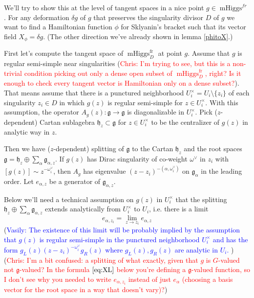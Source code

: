 \documentclass[11pt, oneside, reqno]{amsart}
\theoremstyle{definition} \newtheorem{definition}{Definition}[section]
\theoremstyle{definition} \newtheorem{remark}[definition]{Remark}
\theoremstyle{definition} \newtheorem{remarks}[definition]{Remarks}
\theoremstyle{definition} \newtheorem{question}[definition]{Question}
\theoremstyle{definition} \newtheorem*{note}{Note}
\theoremstyle{definition} \newtheorem{example}[definition]{Example}
\theoremstyle{definition} \newtheorem{examples}[definition]{Examples}
\renewcommand{\gg}{\mathfrak{g}}
\DeclareMathOperator{\mhiggs}{mHiggs}
\newcommand{\fr}{\mathrm{fr}}
\newcommand{\chris}[1]{(\textcolor{red}{Chris: #1})}
\newcommand{\vasily}[1]{(\textcolor{blue}{Vasily: #1})}
\begin{document}
We'll try to show this at the level of tangent spaces in a nice point $g \in \mhiggs^{fr}$.  For any deformation $\delta g $ of $g$ that
preserves the singularity divisor $D$ of $g$ we want to find a Hamiltonian
function $\phi$ for Sklyanin's bracket such that its vector field
$X_\phi = \delta g$.  (The other direction we've already shown in lemma \ref{phitoX}.)


First let's compute the tangent space of $\mhiggs_{D}^{\fr}$ at point $g$.
Assume that $g$ is regular semi-simple near singularities \chris{I'm trying to see, but this is a non-trivial condition picking out only a dense open subset of $\mhiggs_{D}^{\fr}$, right?  Is it enough to check every tangent vector is Hamiltonian only on a dense subset?}. That means assume
that there is a punctured neighborhood $U_i^{\times} = U_{i} \setminus \{z_i \}$ of each singularity $z_i \in D $ in which $g(z)$ is regular semi-simple for $z \in U_{i}^{\times}$. 
With this assumption, the operator $A_{g}(z): \gg \to \gg$ is diagonalizable in $U_{i}^{\times}$.
\newcommand{\hh}{\mathfrak{h}}
Pick ($z$-dependent) Cartan sublagebra $\hh_{z} \subset \gg$  for $z \in U_{i}^{\times}$
to be the centralizer of $g(z)$ in analytic way in $z$. 

Then we have ($z$-dependent) splitting of $\gg$ to the Cartan $\hh_z$ and the root spaces 
$\gg = \hh_{z} \oplus \sum_{\alpha} \gg_{\alpha,z}$. 
If $g(z)$ has Dirac singularity of co-weight $\omega^{\vee}$ in $z_i$ with $[g(z)] \sim z^{-\omega_i^{\vee}}$, then  $A_{g}$ has eigenvalue $ (z - z_i)^{- (\alpha, \omega^{\vee}_{i})}$ on $\gg_{\alpha}$
in the leading order. Let $e_{\alpha, z}$ be a generator of $\gg_{\alpha, z}$.

Below we'll need a technical assumption on $g(z)$ in $U_{i}^{\times}$ that the splitting
$\hh_{z} \oplus \sum_{\alpha} \gg_{\alpha,z}$ extends analytically from $U_{i}^{\times}$ to $U_{i}$,
i.e. there is a limit 
 \[ e_{\alpha, z_i} = \lim_{z \to z_i} e_{\alpha, z}\] 
\vasily{The existence of this limit will be probably implied by the
  assumption that $g(z)$ is regular semi-simple in the punctured
  neighborhood $U_{i}^{\times}$ and has the form $ g_L(z) (z-z_i)^{-\omega_{i}^{\vee}} g_{R}(z)$
  where $g_{L}(z), g_{R}(z)$ are analytic in $U_i$. } \chris{I'm a bit confused: a splitting of what exactly, given that $g$ is $G$-valued not $\gg$-valued?  In the formula $\ref{eq:XL}$ below you're defining a $\gg$-valued function, so I don't see why you needed to write $e_{\alpha,{z_i}}$ instead of just $e_\alpha$ (choosing a basis vector for the root space in a way that doesn't vary)?}
\end{document}
